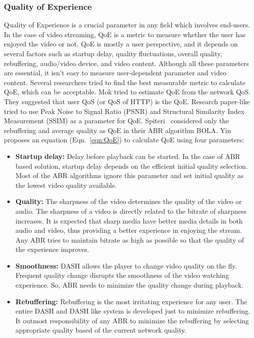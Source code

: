 \subsubsection{Quality of Experience}
Quality of Experience is a crucial parameter in any field which involves end-users. In the case of video streaming, QoE is a metric to measure whether the user has enjoyed the video or not. QoE is mostly a user perspective, and it depends on several factors such as startup delay, quality fluctuations, overall quality, rebuffering, audio/video device, and video content. Although all these parameters are essential, it isn't easy to measure user-dependent parameter and video content. Several researchers tried to find the best measurable metric to calculate QoE, which can be acceptable. Mok \etal \cite{5990550} tried to estimate QoE from the network QoS. They suggested that user QoS (or QoS of HTTP) is the QoE. Research paper-like \cite{} tried to use Peak Noise to Signal Ratio (PSNR) and Structural Similarity Index Measurement (SSIM) as a parameter for QoE. Spiteri \etal\ considered only the rebuffering and average quality as QoE in their ABR algorithm BOLA\cite{7524428}. Yin \etal\cite{10.1145/2785956.2787486} proposes an equation (Eqn.~\ref{eqn:QoE}) to calculate QoE using four parameters:
\begin{itemize}
	\item {\bf Startup delay:} Delay before playback can be started. In the case of ABR based solution, startup delay depends on the efficient initial quality selection. Most of the ABR algorithms ignore this parameter and set initial quality as the lowest video quality available.
	\item {\bf Quality:} The sharpness of the video determines the quality of the video or audio. The sharpness of a video is directly related to the bitrate of sharpness increases. It is expected that sharp media have better media details in both audio and video, thus providing a better experience in enjoying the stream. Any ABR tries to maintain bitrate as high as possible so that the quality of the experience improves.
	\item {\bf Smoothness:} DASH allows the player to change video quality on the fly. Frequent quality change disrupts the smoothness of the video watching experience. So, ABR needs to minimize the quality change during playback.
	\item {\bf Rebuffering:} Rebuffering is the most irritating experience for any user. The entire DASH and DASH like system is developed just to minimize rebuffering. It outmost responsibility of any ABR to minimize the rebuffering by selecting appropriate quality based of the current network quality.
\end{itemize}
